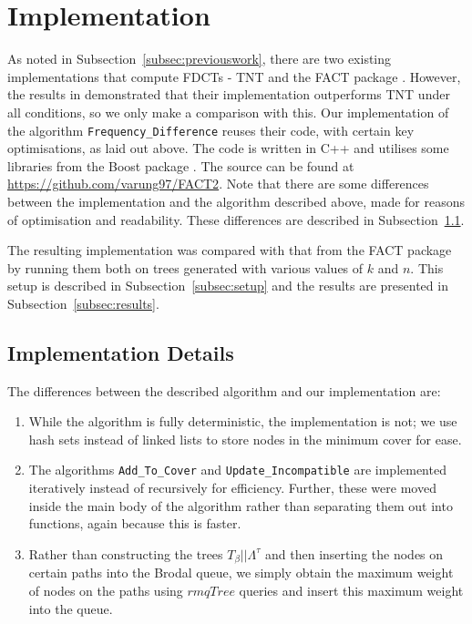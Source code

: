 \documentclass{article}
\newcommand{\leafset}{\Lambda}
\newcommand{\TB}{T_\beta}
\begin{document}
    \section{Implementation}

    As noted in Subsection~\ref{subsec:previouswork}, there are two existing implementations that compute FDCTs - TNT \cite{goloboff2008tnt} and the FACT package \cite{jansson2016improved}. However, the results in \cite{jansson2018algorithms} demonstrated that their implementation outperforms TNT under all conditions, so we only make a comparison with this. Our implementation of the algorithm \texttt{Frequency\_Difference} reuses their code, with certain key optimisations, as laid out above. The code is written in C++ and utilises some libraries from the Boost package \cite{BoostLibrary}. The source can be found at \url{https://github.com/varung97/FACT2}. Note that there are some differences between the implementation and the algorithm described above, made for reasons of optimisation and readability. These differences are described in Subsection~\ref{subsec:implementationdetails}.

    The resulting implementation was compared with that from the FACT package by running them both on trees generated with various values of $k$ and $n$. This setup is described in Subsection~\ref{subsec:setup} and the results are presented in Subsection~\ref{subsec:results}.

    \subsection{Implementation Details}
    \label{subsec:implementationdetails}

    The differences between the described algorithm and our implementation are:

    \begin{enumerate}
        \item While the algorithm is fully deterministic, the implementation is not; we use hash sets instead of linked lists to store nodes in the minimum cover for ease.

        \item The algorithms \texttt{Add\_To\_Cover} and \texttt{Update\_Incompatible} are implemented iteratively instead of recursively for efficiency. Further, these were moved inside the main body of the algorithm rather than separating them out into functions, again because this is faster.

        \item Rather than constructing the trees $\TB||\leafset^{\tau}$ and then inserting the nodes on certain paths into the Brodal queue, we simply obtain the maximum weight of nodes on the paths using $rmqTree$ queries and insert this maximum weight into the queue.
    \end{enumerate}
\end{document}
